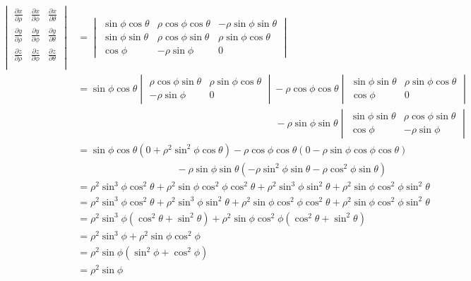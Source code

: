 \documentclass{article}
\newcommand{\lrp}[1]{\left( #1 \right)}
\begin{document}
\begin{align*}
    \begin{vmatrix}
      \frac{\partial x}{\partial \rho} &
      \frac{\partial x}{\partial \phi} &
      \frac{\partial x}{\partial \theta}\\
      \frac{\partial y}{\partial \rho} &
      \frac{\partial y}{\partial \phi} &
      \frac{\partial y}{\partial \theta}\\
      \frac{\partial z}{\partial \rho} &
      \frac{\partial z}{\partial \phi} &
      \frac{\partial z}{\partial \theta}\\
    \end{vmatrix}&=
    \begin{vmatrix}
      \sin\phi\cos\theta & \rho\cos\phi\cos\theta & -\rho\sin\phi\sin\theta\\
      \sin\phi\sin\theta &
      \rho\cos\phi\sin\theta&
      \rho\sin\phi\cos\theta\\
      \cos\phi & -\rho\sin\phi & 0
    \end{vmatrix}\\
   &=\sin\phi\cos\theta\begin{vmatrix}
     \rho \cos\phi\sin\theta & \rho\sin\phi\cos\theta\\
     -\rho\sin\phi & 0
   \end{vmatrix}- \rho\cos\phi\cos\theta
   \begin{vmatrix}
     \sin\phi\sin\theta & \rho\sin\phi\cos\theta\\
     \cos \phi & 0
   \end{vmatrix}\\
   &\hspace{20em}-\rho\sin\phi\sin\theta
   \begin{vmatrix}
     \sin\phi\sin\theta & \rho\cos\phi\sin\theta\\
     \cos\phi &  -\rho\sin\phi
   \end{vmatrix}\\
   &=\sin\phi\cos\theta \lrp{0+\rho^2\sin^2\phi\cos\theta}-\rho\cos\phi\cos\theta\lrp{0-\rho\sin\phi\cos\phi\cos\theta}\\
   &\hspace{10em} -\rho\sin\phi\sin\theta\lrp{-\rho\sin^2\phi\sin\theta -\rho\cos^2\phi\sin\theta}\\
   &=\rho^2\sin^3\phi\cos^2\theta +\rho^2\sin\phi\cos^2\phi\cos^2\theta +\rho^2 \sin^3\phi\sin^2\theta +\rho^2\sin\phi\cos^2\phi\sin^2\theta\\
   &=\rho^2\sin^3\phi\cos^2\theta+\rho^2 \sin^3\phi\sin^2\theta+\rho^2\sin\phi\cos^2\phi\cos^2\theta+\rho^2\sin\phi\cos^2\phi\sin^2\theta\tag{rearrange terms}\\
   &=\rho^2\sin^3\phi\lrp{\cos^2\theta+\sin^2\theta}+\rho^2\sin\phi\cos^2\phi\lrp{\cos^2\theta+\sin^2\theta}\tag{factor}\\
   &=\rho^2\sin^3\phi+\rho^2\sin\phi\cos^2\phi\tag{$\cos^2 u+\sin^2u=1$}\\
   &=\rho^2\sin\phi\lrp{\sin^2\phi+\cos^2\phi}\tag{more factoring}\\
   &=\boxed{\rho^2\sin\phi}\tag{$\cos^2 u+\sin^2u=1$}
\end{align*}
\end{document}
